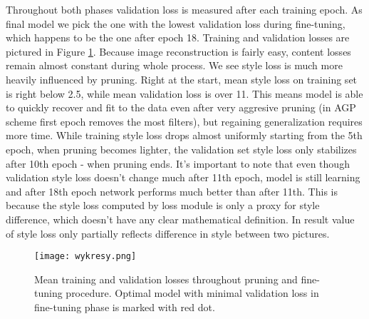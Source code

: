 \documentclass[../Main.tex]{subfiles}
\begin{document}
    Throughout both phases validation loss is measured after each training epoch.
    As final model we pick the one with the lowest validation loss during fine-tuning, 
    which happens to be the one after epoch 18. Training and validation losses are 
    pictured in Figure \ref{fig:wykresy}. Because image reconstruction is fairly 
    easy, content losses remain almost constant during whole process. We see style 
    loss is much more heavily influenced by pruning. Right at the start, mean style loss 
    on training set is right below 2.5, while mean validation loss is over 11. This means 
    model is able to quickly recover and fit to the data even after very aggresive pruning 
    (in AGP scheme first epoch removes the most filters), but regaining generalization requires more
    time. While training style loss drops almost uniformly starting from the 5th epoch, 
    when pruning becomes lighter, the validation set style loss only stabilizes after 10th epoch - 
    when pruning ends. It's important to note that even though validation style loss 
    doesn't change much after 11th epoch, model is still learning and after 18th
    epoch network performs much better than after 11th. This is because the style loss 
    computed by loss module is only a proxy for style difference, which doesn't have 
    any clear mathematical definition. In result value of style loss only partially reflects
    difference in style between two pictures. 
    
    \begin{center}
     \begin{figure}[h!]
            \texttt{[image: wykresy.png]}
            \caption{Mean training and validation losses throughout pruning and fine-tuning
            procedure. Optimal model with minimal validation loss in fine-tuning phase 
            is marked with red dot.
            }
        \label{fig:wykresy}
    \end{figure}
    \end{center}
    




\biblio %
\end{document}
